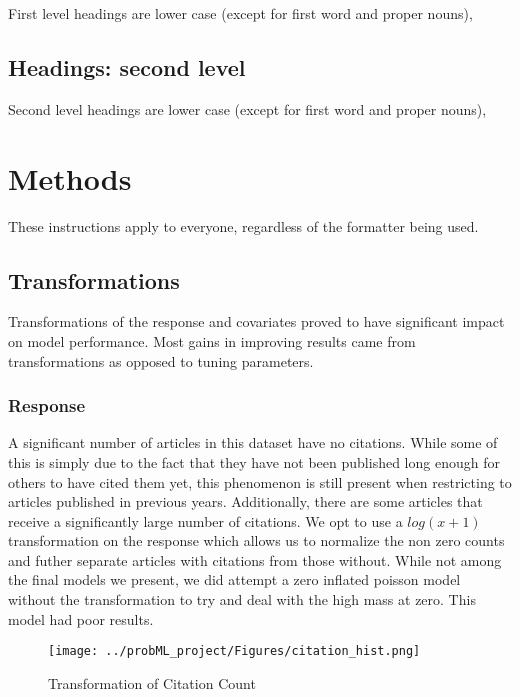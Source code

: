 \documentclass{article} %
\begin{document}
First level headings are lower case (except for first word and proper nouns),


\subsection{Headings: second level}

Second level headings are lower case (except for first word and proper nouns),


\section{Methods}
\label{others}

These instructions apply to everyone, regardless of the formatter being used.

\subsection{Transformations}
Transformations of the response and covariates proved to have significant impact on model performance. Most gains in improving results came from transformations as opposed to tuning parameters.

\subsubsection{Response}
A significant number of articles in this dataset have no citations. While some of this is simply due to the fact that they have not been published long enough for others to have cited them yet, this phenomenon is still present when restricting to articles published in previous years. Additionally, there are some articles that receive a significantly large number of citations. We opt to use a $log(x+1)$ transformation on the response which allows us to normalize the non zero counts and futher separate articles with citations from those without. While not among the final models we present, we did attempt a zero inflated poisson model without the transformation to try and deal with the high mass at zero. This model had poor results.


\begin{figure}[h]
\begin{center}
\texttt{[image: ../probML\_project/Figures/citation\_hist.png]} 
\end{center}
\caption{Transformation of Citation Count}
\end{figure}
\end{document}
